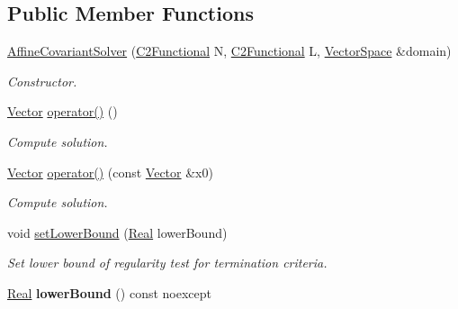 \subsection*{Public Member Functions}
\begin{DoxyCompactItemize}
\item 
\hyperlink{classSpacy_1_1CompositeStep_1_1AffineCovariantSolver_af81f7894dc2b7ee3533ab67d82195751}{Affine\+Covariant\+Solver} (\hyperlink{classSpacy_1_1C2Functional}{C2\+Functional} N, \hyperlink{classSpacy_1_1C2Functional}{C2\+Functional} L, \hyperlink{classSpacy_1_1VectorSpace}{Vector\+Space} \&domain)
\begin{DoxyCompactList}\small\item\em Constructor. \end{DoxyCompactList}\item 
\hypertarget{classSpacy_1_1CompositeStep_1_1AffineCovariantSolver_a010068164773b4062ec122b253a8226c}{}\hyperlink{classSpacy_1_1Vector}{Vector} \hyperlink{classSpacy_1_1CompositeStep_1_1AffineCovariantSolver_a010068164773b4062ec122b253a8226c}{operator()} ()\label{classSpacy_1_1CompositeStep_1_1AffineCovariantSolver_a010068164773b4062ec122b253a8226c}

\begin{DoxyCompactList}\small\item\em Compute solution. \end{DoxyCompactList}\item 
\hyperlink{classSpacy_1_1Vector}{Vector} \hyperlink{classSpacy_1_1CompositeStep_1_1AffineCovariantSolver_ae08612c2a1ca88d9a3746766bd5c1035}{operator()} (const \hyperlink{classSpacy_1_1Vector}{Vector} \&x0)
\begin{DoxyCompactList}\small\item\em Compute solution. \end{DoxyCompactList}\item 
\hypertarget{classSpacy_1_1Mixin_1_1RegularityTest_a051394f2ffb0abd9a26ab7a64c590eee}{}void \hyperlink{classSpacy_1_1Mixin_1_1RegularityTest_a051394f2ffb0abd9a26ab7a64c590eee}{set\+Lower\+Bound} (\hyperlink{classSpacy_1_1Real}{Real} lower\+Bound)\label{classSpacy_1_1Mixin_1_1RegularityTest_a051394f2ffb0abd9a26ab7a64c590eee}

\begin{DoxyCompactList}\small\item\em Set lower bound of regularity test for termination criteria. \end{DoxyCompactList}\item 
\hypertarget{classSpacy_1_1Mixin_1_1RegularityTest_a8a807e4449e6b6b64e7e81834d331597}{}\hyperlink{classSpacy_1_1Real}{Real} {\bfseries lower\+Bound} () const noexcept\label{classSpacy_1_1Mixin_1_1RegularityTest_a8a807e4449e6b6b64e7e81834d331597}


\end{DoxyCompactItemize}
